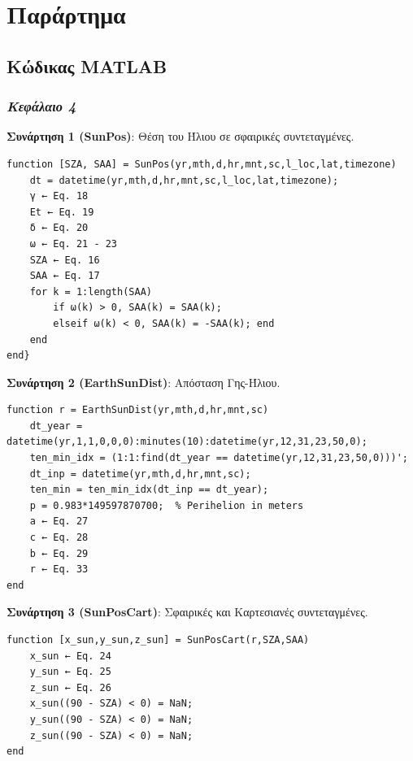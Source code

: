 \documentclass[12pt, a4paper]{report} %
\renewcommand{\thesubsection}{\arabic{section}.\arabic{subsection}.} %
\newcommand{\english}{\foreignlanguage{english}}
\begin{document}
\renewcommand\thesubsection{\Alph{subsection}} %

\section*{Παράρτημα}

\subsection{Κώδικας \english{MATLAB}}
\subsubsection*{\textit{Κεφάλαιο 4}}\label{appx_A_4}

\noindent \textbf{Συνάρτηση 1 (\english{SunPos})}: Θέση του Ήλιου σε σφαιρικές συντεταγμένες.
\begin{lstlisting}
function [SZA, SAA] = SunPos(yr,mth,d,hr,mnt,sc,l_loc,lat,timezone)
    dt = datetime(yr,mth,d,hr,mnt,sc,l_loc,lat,timezone);
    γ ← Eq. 18
    Et ← Eq. 19
    δ ← Eq. 20
    ω ← Eq. 21 - 23
    SZA ← Eq. 16
    SAA ← Eq. 17
    for k = 1:length(SAA)
        if ω(k) > 0, SAA(k) = SAA(k);
        elseif ω(k) < 0, SAA(k) = -SAA(k); end
    end
end}
\end{lstlisting}

\noindent \textbf{Συνάρτηση 2 (\english{EarthSunDist})}: Απόσταση Γης-Ήλιου.
\begin{lstlisting}
function r = EarthSunDist(yr,mth,d,hr,mnt,sc)
    dt_year = datetime(yr,1,1,0,0,0):minutes(10):datetime(yr,12,31,23,50,0);
    ten_min_idx = (1:1:find(dt_year == datetime(yr,12,31,23,50,0)))';
    dt_inp = datetime(yr,mth,d,hr,mnt,sc);
    ten_min = ten_min_idx(dt_inp == dt_year);
    p = 0.983*149597870700;  % Perihelion in meters
    a ← Eq. 27
    c ← Eq. 28
    b ← Eq. 29
    r ← Eq. 33
end
\end{lstlisting}

\noindent \textbf{Συνάρτηση 3 (\english{SunPosCart})}: Σφαιρικές και Καρτεσιανές συντεταγμένες.
\begin{lstlisting}
function [x_sun,y_sun,z_sun] = SunPosCart(r,SZA,SAA)
    x_sun ← Eq. 24
    y_sun ← Eq. 25
    z_sun ← Eq. 26
    x_sun((90 - SZA) < 0) = NaN;
    y_sun((90 - SZA) < 0) = NaN;
    z_sun((90 - SZA) < 0) = NaN;
end
\end{lstlisting}
\end{document}
